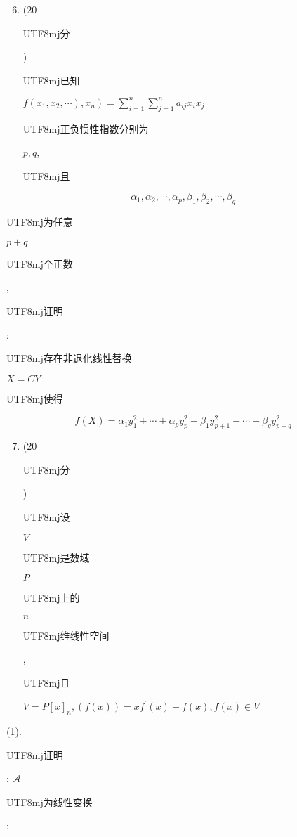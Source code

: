 \documentclass[10pt]{article}
\begin{document}
\begin{enumerate}
  \setcounter{enumi}{5}
  \item (20 \begin{CJK}{UTF8}{mj}分\end{CJK}) \begin{CJK}{UTF8}{mj}已知\end{CJK} $\left.f\left(x_{1}, x_{2}, \cdots\right), x_{n}\right)=\sum_{i=1}^{n} \sum_{j=1}^{n} a_{i j} x_{i} x_{j}$ \begin{CJK}{UTF8}{mj}正负惯性指数分别为\end{CJK} $p, q$, \begin{CJK}{UTF8}{mj}且\end{CJK}
\end{enumerate}
$$
\alpha_{1}, \alpha_{2}, \cdots, \alpha_{p}, \beta_{1}, \beta_{2}, \cdots, \beta_{q}
$$
\begin{CJK}{UTF8}{mj}为任意\end{CJK} $p+q$ \begin{CJK}{UTF8}{mj}个正数\end{CJK}, \begin{CJK}{UTF8}{mj}证明\end{CJK}: \begin{CJK}{UTF8}{mj}存在非退化线性替换\end{CJK} $X=C Y$ \begin{CJK}{UTF8}{mj}使得\end{CJK}
$$
f(X)=\alpha_{1} y_{1}^{2}+\cdots+\alpha_{p} y_{p}^{2}-\beta_{1} y_{p+1}^{2}-\cdots-\beta_{q} y_{p+q}^{2}
$$

\begin{enumerate}
  \setcounter{enumi}{6}
  \item (20 \begin{CJK}{UTF8}{mj}分\end{CJK}) \begin{CJK}{UTF8}{mj}设\end{CJK} $V$ \begin{CJK}{UTF8}{mj}是数域\end{CJK} $P$ \begin{CJK}{UTF8}{mj}上的\end{CJK} $n$ \begin{CJK}{UTF8}{mj}维线性空间\end{CJK}, \begin{CJK}{UTF8}{mj}且\end{CJK} $V=P[x]_{n},(f(x))=x f^{\prime}(x)-f(x), f(x) \in V$
\end{enumerate}
(1). \begin{CJK}{UTF8}{mj}证明\end{CJK}: $\mathscr{A}$ \begin{CJK}{UTF8}{mj}为线性变换\end{CJK};
\end{document}
